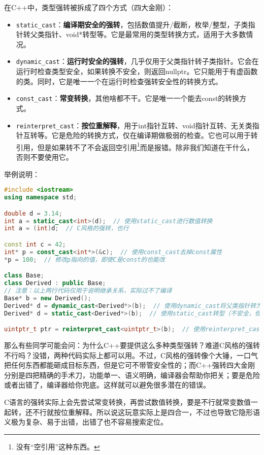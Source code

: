 在C++中，类型强转被拆成了四个方式（四大金刚）：
\begin{itemize}
  \item \texttt{static\_cast}：\textbf{编译期安全的强转}，包括数值提升/截断，枚举/整型，子类指针转父类指针、void*转型等。它是最常用的类型转换方式，适用于大多数情况。
  \item \texttt{dynamic\_cast}：\textbf{运行时安全的强转}，几乎仅用于父类指针转子类指针。它会在运行时检查类型安全，如果转换不安全，则返回nullptr。它只能用于有虚函数的类。同时，它是唯一一个在运行时检查强转安全性的转换方式。
  \item \texttt{const\_cast}：\textbf{常变转换}，其他啥都不干。它是唯一一个能去const的转换方式。
  \item \texttt{reinterpret\_cast}：\textbf{按位重解释}，用于int指针互转、void指针互转、无关类指针互转等。它是危险的转换方式，仅在编译期做极弱的检查。它也可以用于转引用，但是如果转不了不会返回空引用\footnote{没有“空引用”这种东西。}而是报错。除非我们知道在干什么，否则不要使用它。
\end{itemize}

举例说明：
\begin{lstlisting}[language=C++]
#include <iostream>
using namespace std;

double d = 3.14;
int a = static_cast<int>(d);  // 使用static_cast进行数值转换
int a = (int)d;  // C风格的强转，也行

const int c = 42;
int* p = const_cast<int*>(&c);  // 使用const_cast去掉const属性
*p = 100;  // 修改p指向的值，即使C是const的也能改

class Base;
class Derived : public Base;
// 注意：以上两行代码仅用于说明继承关系，实际过不了编译
Base* b = new Derived();
Derived* d = dynamic_cast<Derived*>(b);  // 使用dynamic_cast将父类指针转为子类
Derived* d = static_cast<Derived*>(b);  // 使用static_cast转型（不安全，但是能过编译）

uintptr_t ptr = reinterpret_cast<uintptr_t>(b);  // 使用reinterpret_cast将指针转换为整数
\end{lstlisting}

那么有些同学可能会问：为什么C++要提供这么多种类型强转？难道C风格的强转不行吗？没错，两种代码实际上都可以用。不过，C风格的强转像个大锤，一口气把任何东西都能砸成目标东西，但是它可不带管安全性的；而C++强转四大金刚分别是四把精确的手术刀，功能单一、语义明确，编译器会帮助你把关；要是危险或者出错了，编译器给你兜底。这样就可以避免很多潜在的错误。

C语言的强转实际上会先尝试常变转换，再尝试数值转换，要是不行就常变数值一起转，还不行就按位重解释。所以说这玩意实际上是四合一，不过也导致它隐形语义极为复杂、易于出错，出错了也不容易搜索定位。

